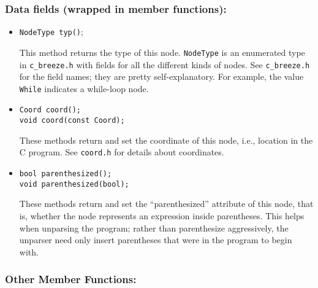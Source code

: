 \documentclass[10pt]{article}
\begin{document}
\subsubsection*{Data fields (wrapped in member functions):} 

\begin{itemize}
\item
\begin{small}
{\tt NodeType typ()};
\end{small}

This method returns the type of this node.  {\tt NodeType} is an enumerated
type in {\tt c\_breeze.h} with fields for all the different kinds of nodes.
See {\tt c\_breeze.h} for the field names; they are pretty self-explanatory.
For example, the value {\tt While} indicates a while-loop node.

\item
\begin{small}
\begin{verbatim}
Coord coord();
void coord(const Coord);
\end{verbatim}
\end{small}

These methods return and set the coordinate of this node, i.e., location in
the C program.  See {\tt coord.h} for details about coordinates.

\item
\begin{small}
\begin{verbatim}
bool parenthesized();
void parenthesized(bool);
\end{verbatim}
\end{small}

These methods return and set the ``parenthesized'' attribute of this node,
that is, whether the node represents an expression inside parentheses.  This
helps when unparsing the program; rather than parenthesize aggressively, the
unparser need only insert parentheses that were in the program to begin
with.

\end{itemize}

\subsubsection*{Other Member Functions:} 
\end{document}
